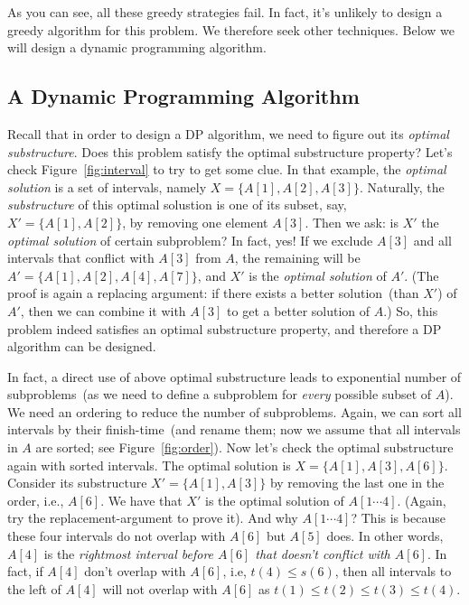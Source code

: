 \documentclass[letterpaper,11pt]{article}
\theoremstyle{mytheorem}
\begin{document}
As you can see, all these greedy strategies fail. In fact, it's unlikely to design a greedy algorithm for this problem.
We therefore seek other techniques. Below we will design a dynamic programming algorithm.

\subsection*{A Dynamic Programming Algorithm}

Recall that in order to design a DP algorithm, we need to figure out its \emph{optimal substructure}.
Does this problem satisfy the optimal substructure property?
Let's check Figure~\ref{fig:interval} to try to get some clue.
In that example, the \emph{optimal solution} is a set of intervals, namely $X = \{A[1], A[2], A[3]\}$.
Naturally, the \emph{substructure} of this optimal solustion is one of its subset, say, $X' = \{A[1], A[2]\}$, by removing one element $A[3]$.
Then we ask: is $X'$ the \emph{optimal solution} of certain subproblem?
In fact, yes! If we exclude $A[3]$ and all intervals that conflict with $A[3]$ from $A$,
the remaining will be $A' = \{A[1], A[2], A[4], A[7]\}$, and $X'$ is 
the \emph{optimal solution} of $A'$. (The proof is again a replacing argument: if there exists a
better solution~(than $X'$) of $A'$, then we can combine it with $A[3]$ to get a better solution of $A$.)
So, this problem indeed satisfies an optimal substructure property, and therefore a DP algorithm can be designed.

In fact, a direct use of above optimal substructure leads to exponential number of subproblems~(as we need to
define a subproblem for \emph{every} possible subset of $A$). We need an ordering to reduce
the number of subproblems.  Again, we can sort all intervals by their finish-time~(and rename them;
now we assume that all intervals in $A$ are sorted; see Figure~\ref{fig:order}).
Now let's check the optimal substructure again with sorted intervals.
The optimal solution is $X = \{A[1], A[3], A[6]\}$.
Consider its substructure $X' = \{A[1], A[3]\}$ by removing the last one in the order, i.e., $A[6]$.
We have that $X'$ is the optimal solution of $A[1\cdots 4]$. (Again, try the replacement-argument to prove it).
And why $A[1\cdots 4]$? This is because these four intervals do not overlap with $A[6]$ but $A[5]$ does.
In other words, $A[4]$ is the \emph{rightmost interval before $A[6]$ that doesn't conflict with $A[6]$}.
In fact, if $A[4]$ don't overlap with $A[6]$, i.e, $t(4)\le s(6)$, then all intervals to the left of $A[4]$ will not overlap with $A[6]$
as $t(1) \le t(2) \le t(3) \le t(4)$. 
\end{document}

